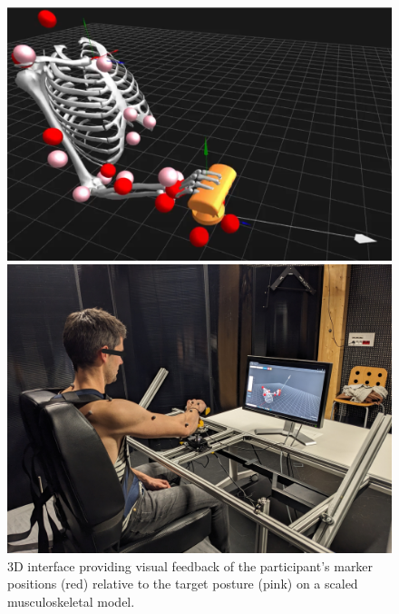 \begin{figure}[!htb]
    \centering
    \captionsetup{justification=centering}
    \begin{minipage}{0.49\linewidth}
        \centering
        \includegraphics[trim={0 0 0 0}, clip, width=1\linewidth]{img/chapter_5/interface_1.png}
    \end{minipage}
    \hfill
    \begin{minipage}{0.49\linewidth}
        \centering
        \includegraphics[trim={0 0 0 60}, clip, width=0.9\linewidth]{img/chapter_5/measure_03.jpg}
    \end{minipage}
    \caption{3D interface providing visual feedback of the participant's marker positions (red) relative to the target posture (pink) on a scaled musculoskeletal model.}
    \label{fig:interface_1}
\end{figure}

